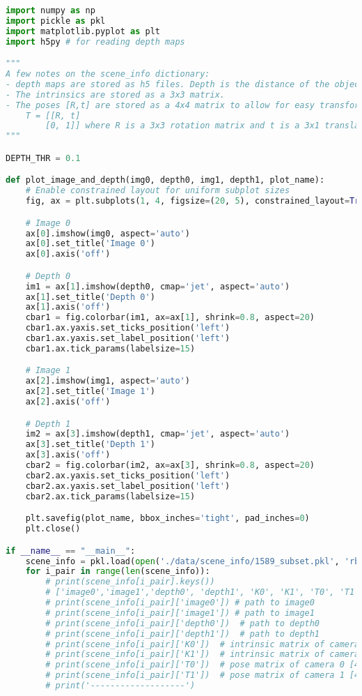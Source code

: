 \documentclass{article}
\begin{document}
\begin{lstlisting}[language=Python]
import numpy as np
import pickle as pkl
import matplotlib.pyplot as plt
import h5py # for reading depth maps

"""
A few notes on the scene_info dictionary:
- depth maps are stored as h5 files. Depth is the distance of the object from the camera (ie Z coordinate in camera coordinates). The depth map can contain invalid points (depth = 0) which correspond to points where the depth could not be estimated.
- The intrinsics are stored as a 3x3 matrix.
- The poses [R,t] are stored as a 4x4 matrix to allow for easy transformation of points from one camera to the other. The resulting transformation matrix is a 4x4 matrix is of the form:
    T = [[R, t]
        [0, 1]] where R is a 3x3 rotation matrix and t is a 3x1 translation vector.
"""

DEPTH_THR = 0.1

def plot_image_and_depth(img0, depth0, img1, depth1, plot_name):
    # Enable constrained layout for uniform subplot sizes
    fig, ax = plt.subplots(1, 4, figsize=(20, 5), constrained_layout=True)

    # Image 0
    ax[0].imshow(img0, aspect='auto')
    ax[0].set_title('Image 0')
    ax[0].axis('off')

    # Depth 0
    im1 = ax[1].imshow(depth0, cmap='jet', aspect='auto')
    ax[1].set_title('Depth 0')
    ax[1].axis('off')
    cbar1 = fig.colorbar(im1, ax=ax[1], shrink=0.8, aspect=20)
    cbar1.ax.yaxis.set_ticks_position('left')
    cbar1.ax.yaxis.set_label_position('left')
    cbar1.ax.tick_params(labelsize=15)

    # Image 1
    ax[2].imshow(img1, aspect='auto')
    ax[2].set_title('Image 1')
    ax[2].axis('off')

    # Depth 1
    im2 = ax[3].imshow(depth1, cmap='jet', aspect='auto')
    ax[3].set_title('Depth 1')
    ax[3].axis('off')
    cbar2 = fig.colorbar(im2, ax=ax[3], shrink=0.8, aspect=20)
    cbar2.ax.yaxis.set_ticks_position('left')
    cbar2.ax.yaxis.set_label_position('left')
    cbar2.ax.tick_params(labelsize=15)

    plt.savefig(plot_name, bbox_inches='tight', pad_inches=0)
    plt.close()

if __name__ == "__main__":
    scene_info = pkl.load(open('./data/scene_info/1589_subset.pkl', 'rb'))
    for i_pair in range(len(scene_info)):
        # print(scene_info[i_pair].keys())
        # ['image0','image1','depth0', 'depth1', 'K0', 'K1', 'T0', 'T1', 'overlap_score']
        # print(scene_info[i_pair]['image0']) # path to image0
        # print(scene_info[i_pair]['image1']) # path to image1
        # print(scene_info[i_pair]['depth0'])  # path to depth0
        # print(scene_info[i_pair]['depth1'])  # path to depth1
        # print(scene_info[i_pair]['K0'])  # intrinsic matrix of camera 0 [3,3]
        # print(scene_info[i_pair]['K1'])  # intrinsic matrix of camera 1 [3,3]
        # print(scene_info[i_pair]['T0'])  # pose matrix of camera 0 [4,4]
        # print(scene_info[i_pair]['T1'])  # pose matrix of camera 1 [4,4]
        # print('-------------------')


\end{lstlisting}
\end{document}

